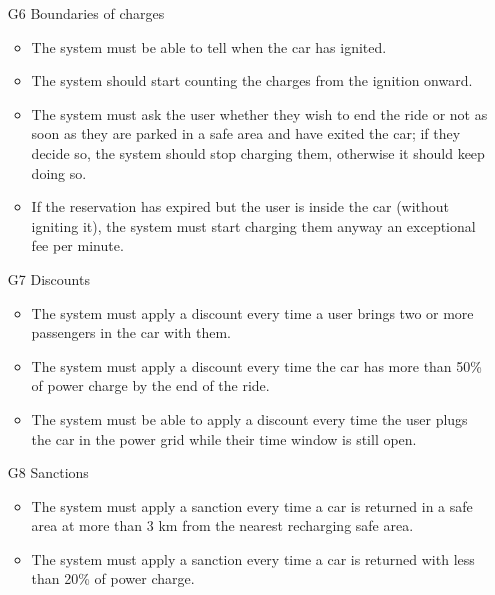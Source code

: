 \begin{itemize}
				\item [G6] Boundaries of charges %
					\begin{itemize}
						\item The system must be able to tell when the car has ignited. 
						\item The system should start counting the charges from the ignition onward. %
						\item The system must ask the user whether they wish to end the ride or not as soon as they are parked in a safe area and have exited the car; if they decide so, the system should stop charging them, otherwise it should keep doing so. 
						\item If the reservation has expired but the user is inside the car (without igniting it), the system must start charging them anyway an exceptional fee per minute. %
					\end{itemize}
					
				\item [G7] Discounts 
					\begin{itemize}
						\item The system must apply a discount every time a user brings two or more passengers in the car with them.
						\item The system must apply a discount every time the car has more than 50\% of power charge by the end of the ride. %
						\item The system must be able to apply a discount every time the user plugs the car in the power grid while their time window is still open.
					\end{itemize}
					
				\item [G8] Sanctions
					\begin{itemize}
						\item The system must apply a sanction every time a car is returned in a safe area at more than 3 km from the nearest recharging safe area.
						\item The system must apply a sanction every time a car is returned with less than 20\% of power charge.
					\end{itemize}
					

\end{itemize}
